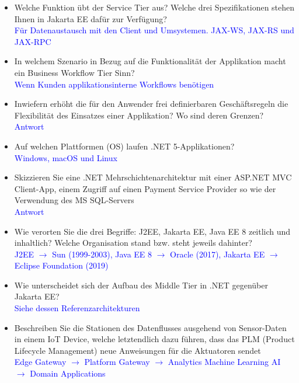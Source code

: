 \begin{itemize}
    \item Welche Funktion übt der Service Tier aus? Welche drei Spezifikationen stehen Ihnen in Jakarta EE dafür zur Verfügung? \\
    \textcolor{blue}{Für Datenaustausch mit den Client und Umsystemen. JAX-WS, JAX-RS und JAX-RPC}
    \item In welchem Szenario in Bezug auf die Funktionalität der Applikation macht ein Business Workflow Tier Sinn? \\
    \textcolor{blue}{Wenn Kunden applikationsinterne Workflows benötigen}
    \item Inwiefern erhöht die für den Anwender frei definierbaren Geschäftsregeln die Flexibilität des Einsatzes einer Applikation? Wo sind deren Grenzen? \\
    \textcolor{blue}{Antwort}
    \item Auf welchen Plattformen (OS) laufen .NET 5-Applikationen? \\
    \textcolor{blue}{Windows, macOS und Linux}
    \item Skizzieren Sie eine .NET Mehrschichtenarchitektur mit einer ASP.NET MVC Client-App, einem Zugriff auf einen Payment Service Provider so wie der Verwendung des MS SQL-Servers \\
    \textcolor{blue}{Antwort}
    \item Wie verorten Sie die drei Begriffe: J2EE, Jakarta EE, Java EE 8 zeitlich und inhaltlich? Welche Organisation stand bzw. steht jeweils dahinter? \\
    \textcolor{blue}{J2EE $\rightarrow$ Sun (1999-2003), Java EE 8 $\rightarrow$ Oracle (2017), Jakarta EE $\rightarrow$ Eclipse Foundation (2019)}
    \item Wie unterscheidet sich der Aufbau des Middle Tier in .NET gegenüber Jakarta EE? \\
    \textcolor{blue}{Siehe dessen Referenzarchitekturen}
    \item Beschreiben Sie die Stationen des Datenflusses ausgehend von Sensor-Daten in einem IoT Device, welche letztendlich dazu führen, dass das PLM (Product Lifecycle Management) neue Anweisungen für die Aktuatoren sendet \\
    \textcolor{blue}{Edge Gateway $\rightarrow$ Platform Gateway $\rightarrow$ Analytics Machine Learning AI $\rightarrow$ Domain Applications}
\end{itemize}
